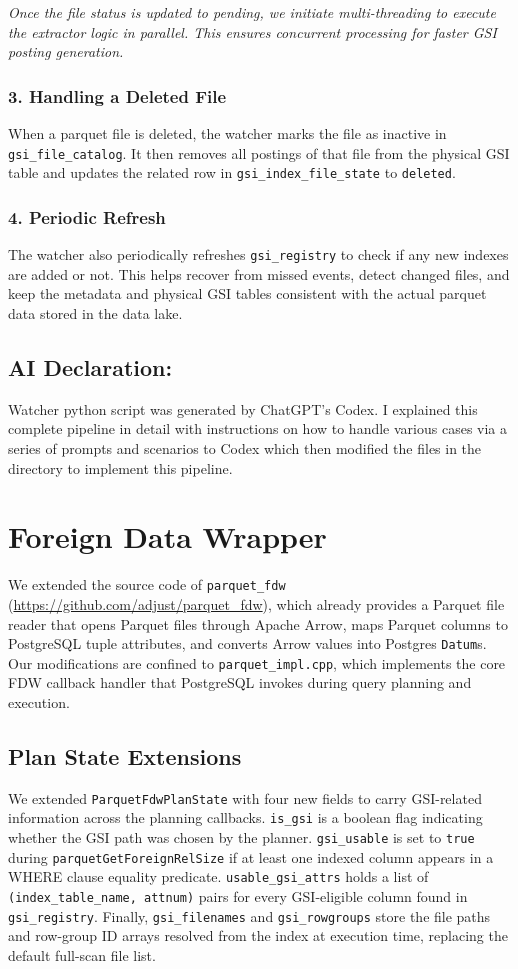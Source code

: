 \documentclass[11pt, a4paper]{article}
\begin{document}
\emph{Once the file status is updated to pending, we initiate multi-threading to execute the extractor logic in parallel. This ensures concurrent processing for faster GSI posting generation.}
\subsubsection*{3. Handling a Deleted File}
When a parquet file is deleted, the watcher marks the file as inactive in \texttt{gsi\_file\_catalog}. It then removes all postings of that file from the physical GSI table and updates the related row in \texttt{gsi\_index\_file\_state} to \texttt{deleted}.

\subsubsection*{4. Periodic Refresh}
The watcher also periodically refreshes \texttt{gsi\_registry} to check if any new indexes are added or not. This helps recover from missed events, detect changed files, and keep the metadata and physical GSI tables consistent with the actual parquet data stored in the data lake.

\subsection{AI Declaration: } Watcher python script was generated by ChatGPT's Codex. I explained this complete pipeline in detail with instructions on how to handle various cases via a series of prompts and scenarios to Codex which then modified the files in the directory to implement this pipeline.

\section{Foreign Data Wrapper}
We extended the source code of \texttt{parquet\_fdw} (\url{https://github.com/adjust/parquet_fdw}), which already provides a Parquet file reader that opens Parquet files through Apache Arrow, maps Parquet columns to PostgreSQL tuple attributes, and converts Arrow values into Postgres \texttt{Datum}s. Our modifications are confined to \texttt{parquet\_impl.cpp}, which implements the core FDW callback handler that PostgreSQL invokes during query planning and execution.

\subsection{Plan State Extensions}
We extended \texttt{ParquetFdwPlanState} with four new fields to carry GSI-related information across the planning callbacks. \texttt{is\_gsi} is a boolean flag indicating whether the GSI path was chosen by the planner. \texttt{gsi\_usable} is set to \texttt{true} during \texttt{parquetGetForeignRelSize} if at least one indexed column appears in a WHERE clause equality predicate. \texttt{usable\_gsi\_attrs} holds a list of \texttt{(index\_table\_name, attnum)} pairs for every GSI-eligible column found in \texttt{gsi\_registry}. Finally, \texttt{gsi\_filenames} and \texttt{gsi\_rowgroups} store the file paths and row-group ID arrays resolved from the index at execution time, replacing the default full-scan file list.
\end{document}
